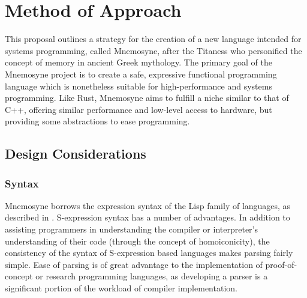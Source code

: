 \documentclass[11pt,a4paper]{article}
\theoremstyle{break}
\begin{document}


\vspace*{-.1in}
\section{Method of Approach}
\label{sec:method}

This proposal outlines a strategy for the creation of a new language intended for systems programming, called Mnemosyne, after the Titaness who personified the concept of memory in ancient Greek mythology. The primary goal of the Mnemosyne project is to create a safe, expressive functional programming language which is nonetheless suitable for high-performance and systems programming. Like Rust, Mnemosyne aims to fulfill a niche similar to that of C++, offering similar performance and low-level access to hardware, but providing some abstractions to ease programming.

\subsection{Design Considerations}

\subsubsection{Syntax}

Mnemosyne borrows the expression syntax of the Lisp family of languages, as described in . S-expression syntax has a number of advantages. In addition to assisting programmers in understanding the compiler or interpreter's understanding of their code (through the concept of homoiconicity), the consistency of the syntax of S-expression based languages makes parsing fairly simple. Ease of parsing is of great advantage to the implementation of proof-of-concept or research programming languages, as developing a parser is a significant portion of the workload of compiler implementation.
\end{document}
